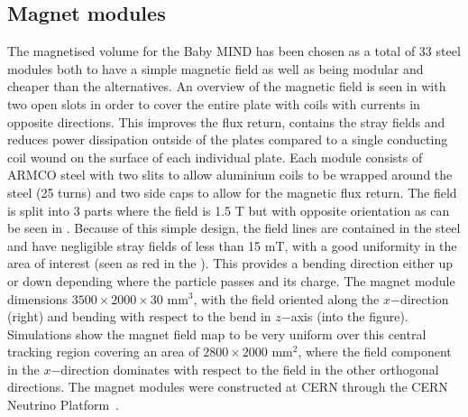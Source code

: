 

\subsection{Magnet modules}

The magnetised volume for the Baby MIND has been chosen as a total of 33 steel modules both to have a simple magnetic field as well as being modular and cheaper than the alternatives. An overview of the magnetic field is seen in  with two open slots in order to cover the entire plate with coils with currents in opposite directions. This improves the flux return, contains the stray fields and reduces power dissipation outside of the plates compared to a single conducting coil wound on the surface of each individual plate. Each module consists of ARMCO steel with two slits to allow aluminium coils to be wrapped around the steel (25 turns) and two side caps to allow for the magnetic flux return. The field is split into 3 parts where the field is 1.5 T but with opposite orientation as can be seen in . Because of this simple design, the field lines are contained in the steel and have negligible stray fields of less than 15 mT, with a good uniformity in the area of interest (seen as red in the ). This provides a bending direction either up or down depending where the particle passes and its charge. The magnet module dimensions $3500 \times 2000 \times 30$ mm$^3$, with the field oriented along the $x$−direction (right) and bending with respect to the bend in $z$−axis (into the figure). Simulations show the magnet field map to be very uniform over this central tracking region covering an area of $2800 \times 2000$ mm$^2$, where the field component in the $x$−direction dominates with respect to the field in the other orthogonal directions. The magnet modules were constructed at CERN through the CERN Neutrino Platform~\cite{50MagnetMIND}.

